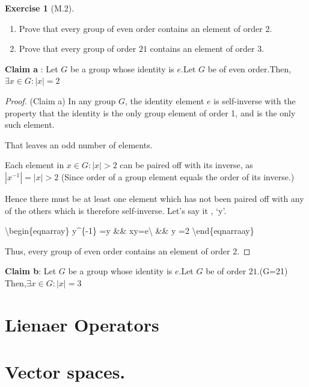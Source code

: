 \documentclass[
]{book}
\providecommand{\tightlist}{%
  \setlength{\itemsep}{0pt}\setlength{\parskip}{0pt}}
\theoremstyle{definition}
\theoremstyle{definition}
\theoremstyle{definition}
\newtheorem{exercise}{Exercise}[chapter]
\theoremstyle{definition}
\theoremstyle{remark}
\begin{document}
\begin{exercise}[M.2]
\protect\hypertarget{exr:unnamed-chunk-102}{}\label{exr:unnamed-chunk-102}\leavevmode

\begin{enumerate}
\def\labelenumi{(\alph{enumi})}
\tightlist
\item
  Prove that every group of even order contains an element of order \(2\).
\item
  Prove that every group of order \(21\) contains an element of order \(3\).
\end{enumerate}

\end{exercise}

\textbf{Claim a} : Let \(G\) be a group whose identity is \(e\).Let \(G\) be of even order.Then,\(\exists x \in G: |x| = 2\)

\begin{proof}
(Claim a) In any group \(G\), the identity element \(e\) is self-inverse with the property that the identity is the only group element of order 1, and is the only such element.

That leaves an odd number of elements.

Each element in \(x \in G: |x| > 2\) can be paired off with its inverse, as \(|x^{-1}| = |x| > 2\) (Since order of a group element equals the order of its inverse.)

Hence there must be at least one element which has not been paired off with any of the others which is therefore self-inverse. Let's say it , `y'.

\textbackslash begin\{eqnarray\}
y\^{}\{-1\} =y \&\iff\& x\cdot y=e\textbackslash{}
\&\iff \& \textbar y\textbar{} =2
\textbackslash end\{eqnarraay\}

Thus, every group of even order contains an element of order \(2\).
\end{proof}

\textbf{Claim b}: Let \(G\) be a group whose identity is \(e\).Let \(G\) be of order \(21\).(\textbar G=21\textbar) Then,\(\exists x \in G: |x| = 3\)

\hypertarget{lienaer-operators}{%
\chapter{Lienaer Operators}\label{lienaer-operators}}

\hypertarget{vector-spaces.}{%
\chapter{Vector spaces.}\label{vector-spaces.}}

  
\end{document}
